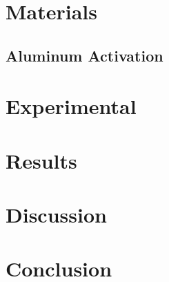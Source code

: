 \documentclass[preprint,12pt,3p]{elsarticle}
\begin{document}
\section{Materials}
\label{materials}

\subsection{Aluminum Activation}

\section{Experimental}
\label{experiment}

\section{Results}
\label{results}

\section{Discussion}
\label{discussion}

\section{Conclusion}
\label{conclusion}





\begin{thebibliography}{00}


\bibitem{}

\end{thebibliography}
\end{document}
